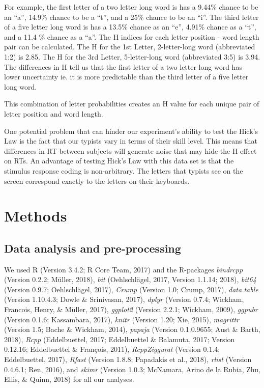 \documentclass[floatsintext,man]{apa6}
\theoremstyle{definition}
\theoremstyle{definition}
\theoremstyle{definition}
\theoremstyle{remark}
\begin{document}
For example, the first letter of a two letter long word is has a 9.44\%
chance to be an \enquote{a}, 14.9\% chance to be a \enquote{t}, and a
25\% chance to be an \enquote{i}. The third letter of a five letter long
word is has a 13.5\% chance as an \enquote{e}, 4.91\% chance as a
\enquote{t}, and a 11.4 \% chance as a \enquote{a}. The H indices for
each letter position - word length pair can be calculated. The H for the
1st Letter, 2-letter-long word (abbreviated 1:2) is 2.85. The H for the
3rd Letter, 5-letter-long word (abbreviated 3:5) is 3.94. The
differences in H tell us that the first letter of a two letter long word
has lower uncertainty ie. it is more predictable than the third letter
of a five letter long word.

This combination of letter probabilities creates an H value for each
unique pair of letter position and word length.

One potential problem that can hinder our experiment's ability to test
the Hick's Law is the fact that our typists vary in terms of their skill
level. This means that differences in RT between subjects will generate
noise that may hide the H effect on RTs. An advantage of testing Hick's
Law with this data set is that the stimulus response coding is
non-arbitrary. The letters that typists see on the screen correspond
exactly to the letters on their keyboards.

\section{Methods}\label{methods}

\subsection{Data analysis and
pre-processing}\label{data-analysis-and-pre-processing}

We used R (Version 3.4.2; R Core Team, 2017) and the R-packages
\emph{bindrcpp} (Version 0.2.2; Müller, 2018), \emph{bit} (Oehlschlägel,
2017, Version 1.1.14; 2018), \emph{bit64} (Version 0.9.7; Oehlschlägel,
2017), \emph{Crump} (Version 1.0; Crump, 2017), \emph{data.table}
(Version 1.10.4.3; Dowle \& Srinivasan, 2017), \emph{dplyr} (Version
0.7.4; Wickham, Francois, Henry, \& Müller, 2017), \emph{ggplot2}
(Version 2.2.1; Wickham, 2009), \emph{ggpubr} (Version 0.1.6;
Kassambara, 2017), \emph{knitr} (Version 1.20; Xie, 2015),
\emph{magrittr} (Version 1.5; Bache \& Wickham, 2014), \emph{papaja}
(Version 0.1.0.9655; Aust \& Barth, 2018), \emph{Rcpp} (Eddelbuettel,
2017; Eddelbuettel \& Balamuta, 2017; Version 0.12.16; Eddelbuettel \&
François, 2011), \emph{RcppZiggurat} (Version 0.1.4; Eddelbuettel,
2017), \emph{Rfast} (Version 1.8.8; Papadakis et al., 2018),
\emph{rlist} (Version 0.4.6.1; Ren, 2016), and \emph{skimr} (Version
1.0.3; McNamara, Arino de la Rubia, Zhu, Ellis, \& Quinn, 2018) for all
our analyses.
\end{document}
